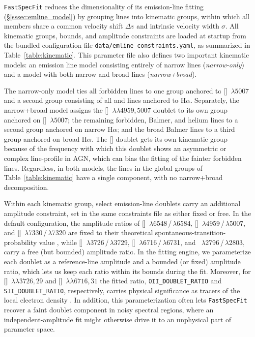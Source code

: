 \documentclass[modern,linenumbers]{aastex702}
\newcommand{\fastspecfit}{\texttt{FastSpecFit}}
\newcommand{\mgii}{\ion{Mg}{2}}
\newcommand{\oii}{[\ion{O}{2}]}
\newcommand{\oiii}{[\ion{O}{3}]}
\newcommand{\nii}{[\ion{N}{2}]}
\newcommand{\sii}{[\ion{S}{2}]}
\newcommand{\hei}{\ion{He}{1}}
\newcommand{\ha}{\ensuremath{\mathrm{H}\alpha}}
\newcommand{\oiiilam}{[\ion{O}{3}]~$\lambda5007$}
\newcommand{\oiidoublet}{[\ion{O}{2}]~$\lambda\lambda3726,29$}
\newcommand{\oiiidoublet}{[\ion{O}{3}]~$\lambda\lambda4959,5007$}
\newcommand{\siidoublet}{[\ion{S}{2}]~$\lambda\lambda6716,31$}
\begin{document}
\fastspecfit{} reduces the dimensionality of its emission-line fitting
(\S\ref{sssec:emline_model}) by grouping lines into kinematic groups,
within which all members share a common velocity shift $\Delta v$ and
intrinsic velocity width $\sigma$. All kinematic groups, bounds, and
amplitude constraints are loaded at startup from the bundled
configuration file \texttt{data/emline-constraints.yaml}, as
summarized in Table~\ref{table:kinematic}. This parameter file also
defines two important kinematic models: an emission line model
consisting entirely of narrow lines (\emph{narrow-only}) and a model
with both narrow and broad lines (\emph{narrow+broad}).



The narrow-only model ties all forbidden lines to one group anchored
to \oiiilam{} and a second group consisting of all  and
\hei{} lines anchored to \ha. Separately, the narrow+broad model
assigns the \oiiidoublet{} doublet to its own group anchored on
\oiiilam; the remaining forbidden, Balmer, and helium lines to a
second group anchored on narrow \ha; and the broad Balmer lines to a
third group anchored on broad \ha. The \oiii{} doublet gets its own
kinematic group because of the frequency with which this doublet shows
an asymmetric or complex line-profile in AGN, which can bias the
fitting of the fainter forbidden lines. Regardless, in both
  models, the lines in the global groups of
  Table~\ref{table:kinematic} have a single component, with no
  narrow+broad decomposition.

Within each kinematic group, select emission-line doublets carry an
additional amplitude constraint, set in the same constraints file as
either fixed or free. In the default configuration, the amplitude
ratios of \nii~$\lambda$6548\,/\,$\lambda$6584,
\oiii~$\lambda$4959\,/\,$\lambda$5007, and
\oii~$\lambda$7330\,/\,$\lambda$7320 are fixed to their theoretical
spontaneous-transition-probability value \citep{osterbrock89a}, while
\oii~$\lambda$3726\,/\,$\lambda$3729,
\sii~$\lambda$6716\,/\,$\lambda$6731, and
\mgii~$\lambda$2796\,/\,$\lambda$2803, carry a free (but bounded)
amplitude ratio. In the fitting engine, we parameterize each doublet
as a reference-line amplitude and a bounded (or fixed) amplitude
ratio, which lets us keep each ratio
  within its bounds during the fit. Moreover, for \oiidoublet{} and
\siidoublet{} the fitted ratio, \texttt{OII\_DOUBLET\_RATIO} and
\texttt{SII\_DOUBLET\_RATIO}, respectively, carries physical
significance as tracers of the local electron density
\citep{osterbrock89a}. In addition, this parameterization often lets
\fastspecfit{} recover a faint doublet component in noisy spectral
regions, where an independent-amplitude fit might otherwise drive it
to an unphysical part of parameter space.
\end{document}
